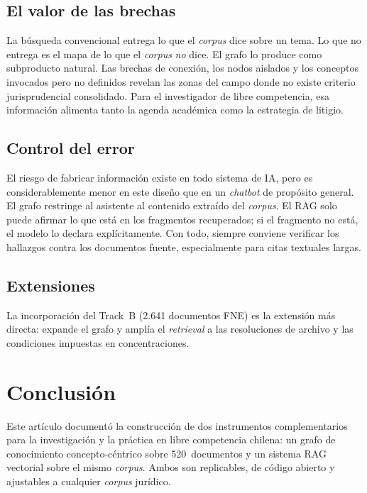 \documentclass[12pt,a4paper]{article}
\begin{document}
\subsection{El valor de las brechas}

La búsqueda convencional entrega lo que el \textit{corpus} dice sobre un tema. Lo que
no entrega es el mapa de lo que el \textit{corpus} \emph{no} dice. El grafo lo produce
como subproducto natural. Las brechas de conexión, los nodos aislados y los
conceptos invocados pero no definidos revelan las zonas del campo donde no existe
criterio jurisprudencial consolidado. Para el investigador de libre competencia, esa información
alimenta tanto la agenda académica como la estrategia de litigio.

\subsection{Control del error}

El riesgo de fabricar información existe en todo sistema de IA, pero es
considerablemente menor en este diseño que en un \textit{chatbot} de propósito
general. El grafo restringe al asistente al contenido extraído del \textit{corpus}.
El RAG solo puede afirmar lo que está en los fragmentos recuperados; si el
fragmento no está, el modelo lo declara explícitamente. Con todo, siempre conviene
verificar los hallazgos contra los documentos fuente, especialmente para citas
textuales largas.

\subsection{Extensiones}

La incorporación del Track~B (2.641 documentos FNE) es la extensión más directa:
expande el grafo y amplía el \textit{retrieval} a las resoluciones de archivo y las
condiciones impuestas en concentraciones.

\section{Conclusión}
\label{sec:conclusion}

Este artículo documentó la construcción de dos instrumentos complementarios para
la investigación y la práctica en libre competencia chilena: un grafo de
conocimiento concepto-céntrico sobre 520~documentos y un sistema RAG vectorial
sobre el mismo \textit{corpus}. Ambos son replicables, de código abierto y
ajustables a cualquier \textit{corpus} jurídico.
\end{document}

